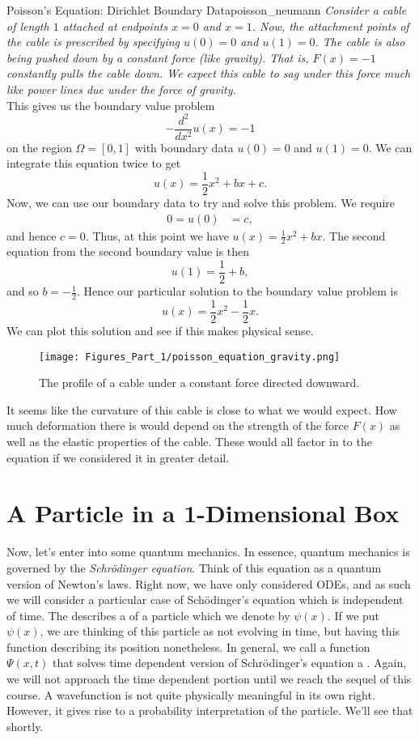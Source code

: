 \begin{ex}{Poisson's Equation: Dirichlet Boundary Data}{poisson_neumann}
\emph{Consider a cable of length $1$ attached at endpoints $x=0$ and $x=1$.  Now, the attachment points of the cable is prescribed by specifying $u(0)=0$ and $u(1)=0$. The cable is also being pushed down by a constant force (like gravity). That is, $F(x)=-1$ constantly pulls the cable down.  We expect this cable to sag under this force much like power lines due under the force of gravity.}\\

This gives us the boundary value problem
\[
-\frac{d^2}{dx^2}u(x)=-1
\]
on the region $\Omega = [0,1]$ with boundary data $u(0)=0$ and $u(1)=0$. We can integrate this equation twice to get
\[
u(x)= \frac{1}{2}x^2+bx+c.
\]
Now, we can use our boundary data to try and solve this problem. We require
\begin{align*}
    0=u(0)&=c,
\end{align*}
and hence $c=0$.  Thus, at this point we have $u(x)=\frac{1}{2}x^2+bx$.  The second equation from the second boundary value is then
\[
u(1)=\frac{1}{2}+b,
\]
and so $b=-\frac{1}{2}$. Hence our particular solution to the boundary value problem is
\[
\boxed{u(x)=\frac{1}{2}x^2-\frac{1}{2}x.}
\]
We can plot this solution and see if this makes physical sense.
\begin{figure}[H]
    \centering
    \texttt{[image: Figures\_Part\_1/poisson\_equation\_gravity.png]}
    \caption{The profile of a cable under a constant force directed downward.}
\end{figure}

It seems like the curvature of this cable is close to what we would expect.  How much deformation there is would depend on the strength of the force $F(x)$ as well as the elastic properties of the cable.  These would all factor in to the equation if we considered it in greater detail.
\end{ex}

\section{A Particle in a 1-Dimensional Box}

Now, let's enter into some quantum mechanics.  In essence, quantum mechanics is governed by the \emph{Schr\"odinger equation}.  Think of this equation as a quantum version of Newton's laws.  Right now, we have only considered ODEs, and as such we will consider a particular case of Sch\"odinger's equation which is independent of time. The  describes a  of a particle which we denote by $\psi(x)$.  If we put $\psi(x)$, we are thinking of this particle as not evolving in time, but having this function describing its position nonetheless.  In general, we call a function $\Psi(x,t)$ that solves time dependent version of Schr\"odinger's equation a . Again, we will not approach the time dependent portion until we reach the sequel of this course.  A wavefunction is not quite physically meaningful in its own right.  However, it gives rise to a probability interpretation of the particle. We'll see that shortly.

